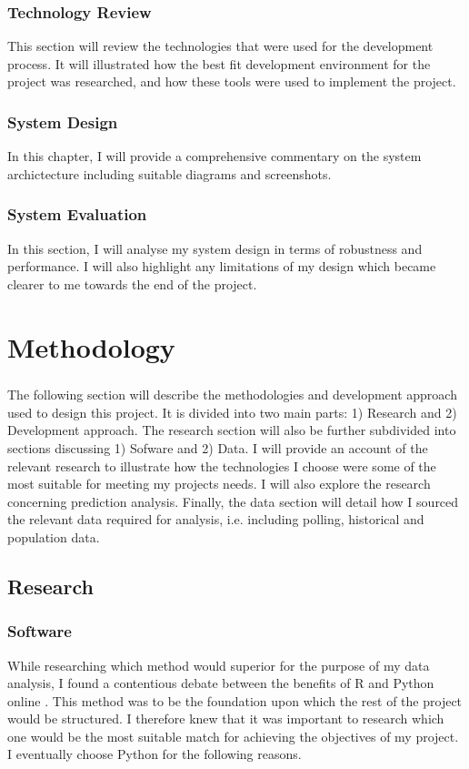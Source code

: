 \subsection{Technology Review}
This section will review the technologies that were used for the development process. It will illustrated how the best fit development environment for the project was researched, and how these tools were used to implement the project.
\subsection{System Design}
In this chapter, I will provide a comprehensive commentary on the system archictecture including suitable diagrams and screenshots. 
\subsection{System Evaluation}
In this section, I will analyse my system design in terms of robustness and performance. I will also highlight any limitations of my design which became clearer to me towards the end of the project. 

\chapter{Methodology}
\paragraph{}
The following section will describe the methodologies and development approach used to
design this project. It is divided into two main parts: 1) Research and 2) Development approach. The research section will also be further subdivided into sections discussing 1) Sofware and 2) Data. I will provide an account of the relevant research to illustrate how the technologies I choose were some of the most suitable for meeting my projects needs. I will also explore the research
concerning prediction analysis. Finally, the data section will detail how I sourced the
relevant data required for analysis, i.e. including polling, historical and population data.

\section{Research}
\subsection{Software}
While researching which method would superior for the purpose of my data analysis, I found a contentious debate between the benefits of R and Python online \cite{debate}. This method was to be the foundation upon which the rest of the project would be structured.  I therefore knew that it was important to research which one would be the most suitable match for achieving the objectives of my project. I eventually choose Python for the following reasons.

